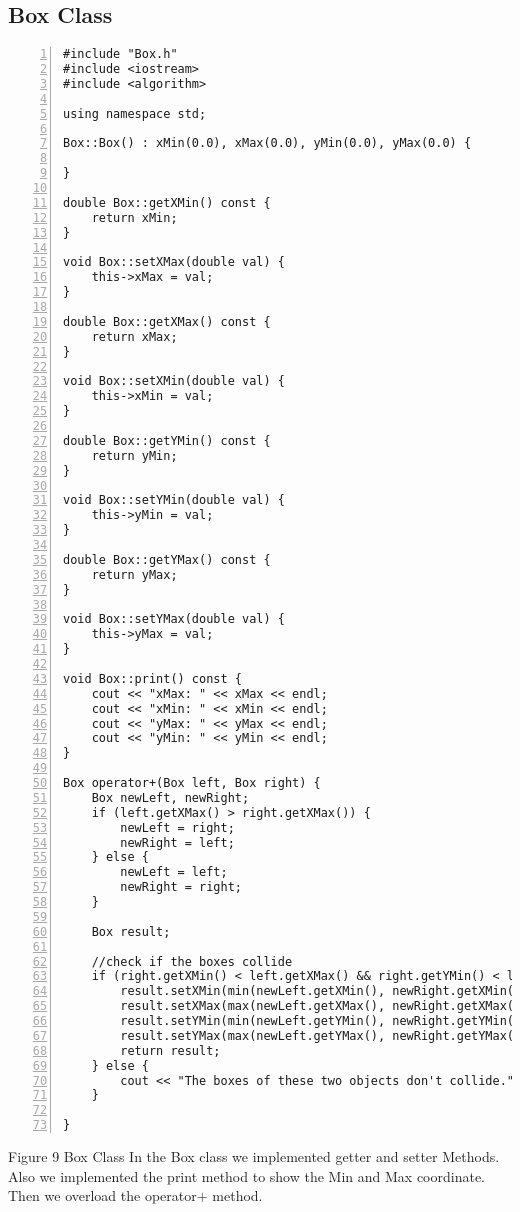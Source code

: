 \documentclass{llncs}
\begin{document}
\subsection{Box Class}

\begin{lstlisting}[basicstyle=\footnotesize\ttfamily, numbers=left, stepnumber=1, numberstyle = \normalsize]
#include "Box.h"
#include <iostream>
#include <algorithm>

using namespace std;

Box::Box() : xMin(0.0), xMax(0.0), yMin(0.0), yMax(0.0) {

}

double Box::getXMin() const {
	return xMin;
}

void Box::setXMax(double val) {
	this->xMax = val;
}

double Box::getXMax() const {
	return xMax;
}

void Box::setXMin(double val) {
	this->xMin = val; 
}

double Box::getYMin() const {
	return yMin;
}

void Box::setYMin(double val) {
	this->yMin = val;
}

double Box::getYMax() const {
	return yMax;
}

void Box::setYMax(double val) {
	this->yMax = val; 
}

void Box::print() const {
	cout << "xMax: " << xMax << endl; 
	cout << "xMin: " << xMin << endl;
	cout << "yMax: " << yMax << endl;
	cout << "yMin: " << yMin << endl;
}

Box operator+(Box left, Box right) {
	Box newLeft, newRight;
	if (left.getXMax() > right.getXMax()) {
		newLeft = right;
		newRight = left;
	} else {
		newLeft = left;
		newRight = right;
	}

	Box result; 

	//check if the boxes collide
	if (right.getXMin() < left.getXMax() && right.getYMin() < left.getYMax()) {
		result.setXMin(min(newLeft.getXMin(), newRight.getXMin()));
		result.setXMax(max(newLeft.getXMax(), newRight.getXMax()));
		result.setYMin(min(newLeft.getYMin(), newRight.getYMin()));
		result.setYMax(max(newLeft.getYMax(), newRight.getYMax()));
		return result;
	} else {
		cout << "The boxes of these two objects don't collide." << '\n';
	}
	 
}
\end{lstlisting}
\scriptsize{Figure 9 Box Class}\newline
\newline
\newline
In the Box class we implemented getter and setter Methods. Also we implemented the print method to show the Min and Max coordinate. Then we overload the  operator$+$ method.
\end{document}
